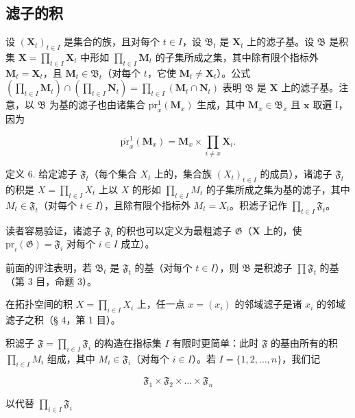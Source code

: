 \subsection{滤子的积}

设 \((\mathbf{X}_t)_{t \in I}\) 是集合的族，且对每个 \(t \in I\)，设 \(\mathfrak{B}_t\) 是 \(\mathbf{X}_t\) 上的滤子基。设 \(\mathfrak{B}\) 是积集 \(\mathbf{X} = \prod_{t \in I} \mathbf{X}_t\) 中形如 \(\prod_{t \in I} \mathbf{M}_t\) 的子集所成之集，其中除有限个指标外 \(\mathbf{M}_t = \mathbf{X}_t\)，且 \(\mathbf{M}_t \in \mathfrak{B}_t\)（对每个 \(t\)，它使 \(\mathbf{M}_t \neq \mathbf{X}_t\)）。公式 \(\left(\prod_{t \in I} \mathbf{M}_t\right) \cap \left(\prod_{t \in I} \mathbf{N}_t\right) = \prod_{t \in I} (\mathbf{M}_t \cap \mathbf{N}_t)\) 表明 \(\mathfrak{B}\) 是 \(\mathbf{X}\) 上的滤子基。注意，以 \(\mathfrak{B}\) 为基的滤子也由诸集合 \(\overline{\mathrm{pr}}_x^1 (\mathbf{M}_x)\) 生成，其中 \(\mathbf{M}_x\in \mathfrak{B}_x\) 且 \(\pmb{x}\) 取遍 I，因为

\[
\overline {{\mathrm{pr}}} _ {x} ^ {1} \left(\mathbf {M} _ {x}\right) = \mathbf {M} _ {x} \times \prod_ {i \neq x} \mathbf {X} _ {i}.
\]

定义 6. 给定滤子 \(\mathfrak{F}_t\)（每个集合 \(X_t\) 上的，集合族 \((X_t)_{t \in I}\) 的成员），诸滤子 \(\mathfrak{F}_t\) 的积是 \(X = \prod_{t \in I} X_t\) 上以 \(X\) 的形如 \(\prod_{t \in I} M_t\) 的子集所成之集为基的滤子，其中 \(M_t \in \mathfrak{F}_t\)（对每个 \(t \in I\)），且除有限个指标外 \(M_t = X_t\)。积滤子记作 \(\prod_{t \in I} \mathfrak{F}_t\)。

读者容易验证，诸滤子 \(\mathfrak{F}_i\) 的积也可以定义为最粗滤子 \(\mathfrak{G}\)（\(\mathbf{X}\) 上的，使 \(\mathrm{pr}_i(\mathfrak{G}) = \mathfrak{F}_i\) 对每个 \(i \in I\) 成立）。

前面的评注表明，若 \(\mathfrak{B}_{t}\) 是 \(\mathfrak{F}_{t}\) 的基（对每个 \(t\in I\)），则 \(\mathfrak{B}\) 是积滤子 \(\prod \mathfrak{F}_{t}\) 的基（第 3 目，命题 3）。

在拓扑空间的积 \(X = \prod_{i \in I} X_i\) 上，任一点 \(x = (x_i)\) 的邻域滤子是诸 \(x_i\) 的邻域滤子之积（§ 4，第 1 目）。

积滤子 \(\mathfrak{F} = \prod_{i\in I}\mathfrak{F}_i\) 的构造在指标集 \(I\) 有限时更简单：此时 \(\mathfrak{F}\) 的基由所有的积 \(\prod_{i\in I}M_i\) 组成，其中 \(M_i\in \mathfrak{F}_i\)（对每个 \(i\in I\)）。若 \(I = \{1,2,\ldots,n\}\)，我们记

\[
\mathfrak {F} _ {1} \times \mathfrak {F} _ {2} \times \dots \times \mathfrak {F} _ {n}
\]

以代替 \(\prod_{i\in I}\mathfrak{F}_i\)

